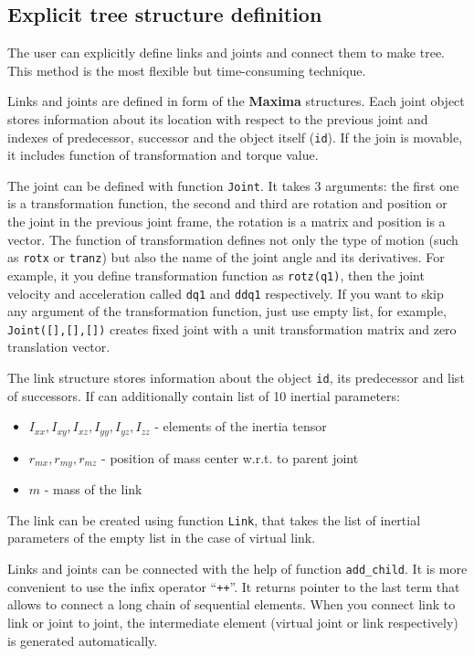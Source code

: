 \documentclass{article}
\begin{document}
\subsection{Explicit tree structure definition} 

The user can explicitly define links and joints and connect them to make tree. This method is the most flexible but time-consuming technique.  

Links and joints are defined in form of the \textbf{Maxima} structures. Each joint object stores information about its location with respect to the previous joint and indexes of predecessor, successor and the object itself (\texttt{id}). If the join is movable, it includes function of transformation and torque value.  

The joint can be defined with function \texttt{Joint}. It takes 3 arguments: the first one is a transformation function, the second and third are rotation and position or the joint in the previous joint frame, the rotation is a matrix and position is a vector. 
The function of transformation defines not only the type of motion (such as \texttt{rotx} or \texttt{tranz}) but also the name of the joint angle and its derivatives. For example, it you define transformation function as \texttt{rotz(q1)}, then the joint velocity and acceleration called \texttt{dq1} and \texttt{ddq1} respectively. If you want to skip any argument of the transformation function, just use empty list, for example, \texttt{Joint([],[],[])} creates fixed joint with a unit transformation matrix and zero translation vector. 

The link structure stores information about the object \texttt{id}, its predecessor and list of successors. If can additionally contain list of 10 inertial parameters:
\begin{itemize}
    \item $I_{xx}, I_{xy}, I_{xz}, I_{yy}, I_{yz}, I_{zz}$ - elements of the inertia tensor 
    \item $r_{mx}, r_{my}, r_{mz}$ - position of mass center w.r.t. to parent joint
    \item $m$ - mass of the link
\end{itemize}
The link can be created using function \texttt{Link}, that takes the list of inertial parameters of the empty list in the case of virtual link. 

Links and joints can be connected with the help of function \texttt{add\_child}. It is more convenient to use the infix operator ``\texttt{++}''. It returns pointer to the last term that allows to connect a long chain of sequential elements. When you connect link to link or joint to joint, the intermediate element (virtual joint or link respectively) is generated automatically.  
\end{document}

